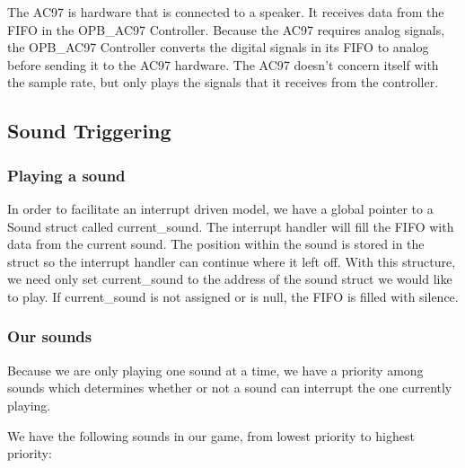 \documentclass[11pt,letter,oneside]{report}
\begin{document}
The AC97 is hardware that is connected to a speaker. It receives data from the FIFO in the OPB\_AC97 Controller. Because the AC97 requires analog signals, the OPB\_AC97 Controller converts the digital signals in its FIFO to analog before sending it to the AC97 hardware. The AC97 doesn't concern itself with the sample rate, but only plays the signals that it receives from the controller.

\subsection{Sound Triggering}

\subsubsection{Playing a sound}
In order to facilitate an interrupt driven model, we have a global pointer to a Sound struct  called current\_sound.  The interrupt handler will fill the FIFO with data from the current sound.  The position within the sound is stored in the struct so the interrupt handler can continue where it left off.  With this structure, we need only set current\_sound to the address of the sound struct we would like to play.  If current\_sound is not assigned or is null, the FIFO is filled with silence.

\subsubsection{Our sounds}

Because we are only playing one sound at a time, we have a priority among sounds which determines whether or not a sound can interrupt the one currently playing.

We have the following sounds in our game, from lowest priority to highest priority:
\end{document}
